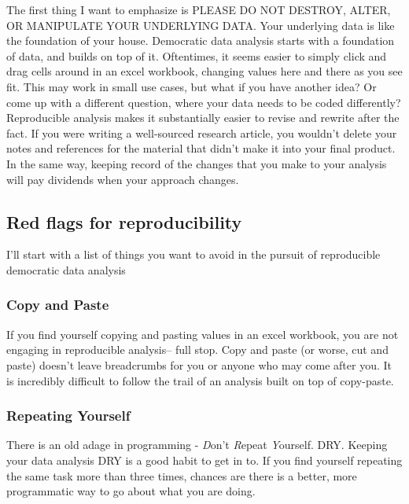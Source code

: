 \documentclass[]{book}
\begin{document}
The first thing I want to emphasize is PLEASE DO NOT DESTROY, ALTER, OR MANIPULATE YOUR UNDERLYING DATA. Your underlying data is like the foundation of your house. Democratic data analysis starts with a foundation of data, and builds on top of it. Oftentimes, it seems easier to simply click and drag cells around in an excel workbook, changing values here and there as you see fit. This may work in small use cases, but what if you have another idea? Or come up with a different question, where your data needs to be coded differently? Reproducible analysis makes it substantially easier to revise and rewrite after the fact. If you were writing a well-sourced research article, you wouldn't delete your notes and references for the material that didn't make it into your final product. In the same way, keeping record of the changes that you make to your analysis will pay dividends when your approach changes.

\hypertarget{red-flags-for-reproducibility}{%
\subsection{Red flags for reproducibility}\label{red-flags-for-reproducibility}}

I'll start with a list of things you want to avoid in the pursuit of reproducible democratic data analysis

\hypertarget{copy-and-paste}{%
\subsubsection{Copy and Paste}\label{copy-and-paste}}

If you find yourself copying and pasting values in an excel workbook, you are not engaging in reproducible analysis-- full stop. Copy and paste (or worse, cut and paste) doesn't leave breadcrumbs for you or anyone who may come after you. It is incredibly difficult to follow the trail of an analysis built on top of copy-paste.

\hypertarget{repeating-yourself}{%
\subsubsection{Repeating Yourself}\label{repeating-yourself}}

There is an old adage in programming - \emph{D}on't \emph{R}epeat \emph{Y}ourself. DRY. Keeping your data analysis DRY is a good habit to get in to. If you find yourself repeating the same task more than three times, chances are there is a better, more programmatic way to go about what you are doing.
\end{document}
